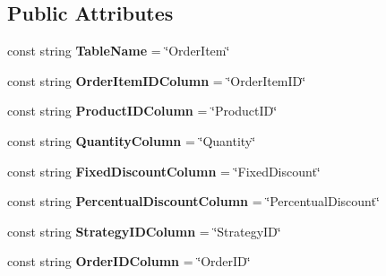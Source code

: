 \subsection*{Public Attributes}
\begin{DoxyCompactItemize}
\item 
\mbox{\label{class_eshop_1_1_order_item_ad8083c5a8364cc91c5fe74be7d3d235c}} 
const string {\bfseries Table\+Name} = \char`\"{}Order\+Item\char`\"{}
\item 
\mbox{\label{class_eshop_1_1_order_item_a693719de0a5fa77bdc8d1389dade8ed1}} 
const string {\bfseries Order\+Item\+I\+D\+Column} = \char`\"{}Order\+Item\+ID\char`\"{}
\item 
\mbox{\label{class_eshop_1_1_order_item_a1a6bbc6bdc17f0349f8e9fc10b05b6a4}} 
const string {\bfseries Product\+I\+D\+Column} = \char`\"{}Product\+ID\char`\"{}
\item 
\mbox{\label{class_eshop_1_1_order_item_ad1f1132887ac9eb4d72381c8eb6be94b}} 
const string {\bfseries Quantity\+Column} = \char`\"{}Quantity\char`\"{}
\item 
\mbox{\label{class_eshop_1_1_order_item_ab69554de406188753c6802ca3f9772a3}} 
const string {\bfseries Fixed\+Discount\+Column} = \char`\"{}Fixed\+Discount\char`\"{}
\item 
\mbox{\label{class_eshop_1_1_order_item_a5c8adcfe2d7301dbce5c3abc53989913}} 
const string {\bfseries Percentual\+Discount\+Column} = \char`\"{}Percentual\+Discount\char`\"{}
\item 
\mbox{\label{class_eshop_1_1_order_item_a62e90f8ef5a13c8078095a0799562a2a}} 
const string {\bfseries Strategy\+I\+D\+Column} = \char`\"{}Strategy\+ID\char`\"{}
\item 
\mbox{\label{class_eshop_1_1_order_item_aced415d0ff3187b4bf74de249756b4ec}} 
const string {\bfseries Order\+I\+D\+Column} = \char`\"{}Order\+ID\char`\"{}
\end{DoxyCompactItemize}
